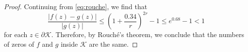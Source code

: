 \documentclass[10pt,a4paper]{amsart}
\begin{document}
\begin{proof}
Continuing from \eqref{eq:rouche}, we find that
\begin{equation} \label{eq:rouchebnd}
	\frac{ |f(z) - g(z)|}{|g(z)|} \leq \left( 1 + \frac{0.34}{r} \right)^{2r} - 1 \leq e^{0.68} - 1 < 1 
\end{equation} 
for each $z \in \partial \mathcal K$.  Therefore, by Rouch\'{e}'s theorem, we conclude that the numbers of zeros of $f$ and $g$ inside $\mathcal{K}$ are the same.
\end{proof}
\end{document}
